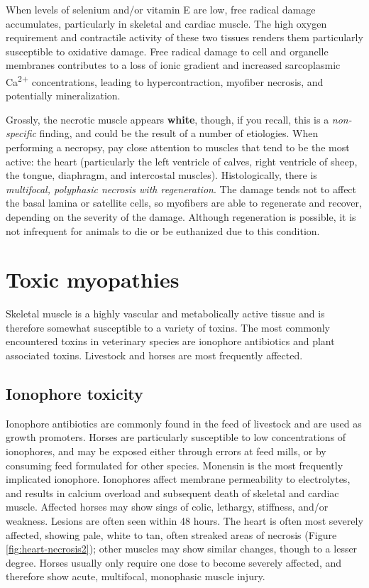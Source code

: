 \documentclass[openany]{book}
\begin{document}
When levels of selenium and/or vitamin E are low, free radical damage
accumulates, particularly in skeletal and cardiac muscle. The high
oxygen requirement and contractile activity of these two tissues renders
them particularly susceptible to oxidative damage. Free radical damage
to cell and organelle membranes contributes to a loss of ionic gradient
and increased sarcoplasmic Ca\textsuperscript{2+} concentrations,
leading to hypercontraction, myofiber necrosis, and potentially
mineralization.

Grossly, the necrotic muscle appears \textbf{white}, though, if you
recall, this is a \emph{non-specific} finding, and could be the result
of a number of etiologies. When performing a necropsy, pay close
attention to muscles that tend to be the most active: the heart
(particularly the left ventricle of calves, right ventricle of sheep,
the tongue, diaphragm, and intercostal muscles). Histologically, there
is \emph{multifocal, polyphasic necrosis with regeneration}. The damage
tends not to affect the basal lamina or satellite cells, so myofibers
are able to regenerate and recover, depending on the severity of the
damage. Although regeneration is possible, it is not infrequent for
animals to die or be euthanized due to this condition.

\chapter{Toxic myopathies}\label{toxic-myopathies}

Skeletal muscle is a highly vascular and metabolically active tissue and
is therefore somewhat susceptible to a variety of toxins. The most
commonly encountered toxins in veterinary species are ionophore
antibiotics and plant associated toxins. Livestock and horses are most
frequently affected.

\hypertarget{ionophore-toxicity}{\section{Ionophore
toxicity}\label{ionophore-toxicity}}

Ionophore antibiotics are commonly found in the feed of livestock and
are used as growth promoters. Horses are particularly susceptible to low
concentrations of ionophores, and may be exposed either through errors
at feed mills, or by consuming feed formulated for other species.
Monensin is the most frequently implicated ionophore. Ionophores affect
membrane permeability to electrolytes, and results in calcium overload
and subsequent death of skeletal and cardiac muscle. Affected horses may
show sings of colic, lethargy, stiffness, and/or weakness. Lesions are
often seen within 48 hours. The heart is often most severely affected,
showing pale, white to tan, often streaked areas of necrosis (Figure
\ref{fig:heart-necrosis2}); other muscles may show similar changes,
though to a lesser degree. Horses usually only require one dose to
become severely affected, and therefore show acute, multifocal,
monophasic muscle injury.
\end{document}

